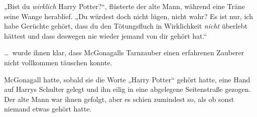 „Bist du \emph{wirklich} Harry Potter?“, flüsterte der alte Mann, während eine Träne seine Wange herablief.
„Du würdest doch nicht lügen, nicht wahr? Es ist nur, ich habe Gerüchte gehört, dass du den Tötungsfluch in Wirklichkeit \emph{nicht} überlebt hättest und dass deswegen nie wieder jemand von dir gehört hat.“

… wurde ihnen klar, dass McGonagalls Tarnzauber einen erfahrenen Zauberer nicht vollkommen täuschen konnte.

McGonagall hatte, sobald sie die Worte „Harry Potter“ gehört hatte, eine Hand auf Harrys Schulter gelegt und ihn eilig in eine abgelegene Seitenstraße gezogen. Der alte Mann war ihnen gefolgt, aber es schien zumindest so, als ob sonst niemand etwas gehört hatte.

